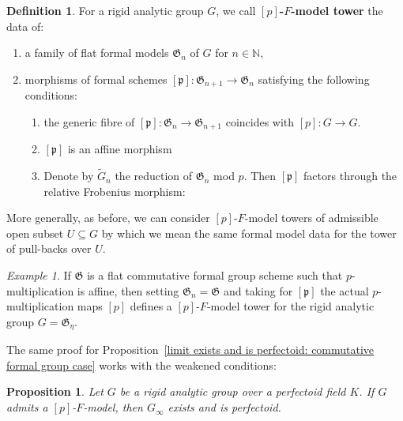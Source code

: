 \documentclass[10pt,oneside]{amsart}
\newtheorem{proposition}[theorem]{Proposition}
\theoremstyle{definition}
\newtheorem{definition}[theorem]{Definition}
\theoremstyle{remark}
\newtheorem*{example}{Example}
\begin{document}
	\begin{definition}
		For a rigid analytic group $G$, we call \textbf{$[p]$-$F$-model tower} the data of:
		\begin{enumerate}
			\item a family of flat formal models $\mathfrak G_n$ of $G$ for $n\in \mathbb N$,
			\item morphisms of formal schemes $[\mathfrak p]:\mathfrak G_{n+1}\rightarrow \mathfrak G_{n}$ satisfying the following conditions:
			\begin{enumerate}
				\item the generic fibre of $[\mathfrak p]:\mathfrak G_n\rightarrow \mathfrak G_{n+1}$ coincides with $[p]:G\rightarrow G$. 
				\item $[\mathfrak p]$ is an affine morphism
				\item Denote by $\tilde{G}_n$ the reduction of $\mathfrak G_n$ mod $p$. Then $[\mathfrak p]$ factors through the relative Frobenius morphism:
				\begin{center}
				\end{center}
				
			\end{enumerate}
			
			 
		\end{enumerate}
	\end{definition}
	More generally, as before, we can consider $[p]$-$F$-model towers of admissible open subset $U\subseteq G$ by which we mean the same formal model data for the tower of pull-backs over $U$.
	
	\begin{example}
		If $\mathfrak G$ is a flat commutative formal group scheme such that $p$-multiplication is affine, then setting $\mathfrak G_n = \mathfrak G$ and taking for $[\mathfrak p]$ the actual $p$-multiplication maps $[p]$ defines a $[p]$-$F$-model tower for the rigid analytic group $G=\mathfrak G_\eta$.
	\end{example}
	
	 The same proof for Proposition~\ref{limit exists and is perfectoid: commutative formal group case} works with the weakened conditions: 
	\begin{proposition}\label{existence of p-F-model tower implies perfectoid}
		Let $G$ be a rigid analytic group over a perfectoid field $K$. If $G$ admits a $[p]$-$F$-model, then $G_\infty$ exists and is perfectoid.
	\end{proposition}
 
\end{document}
